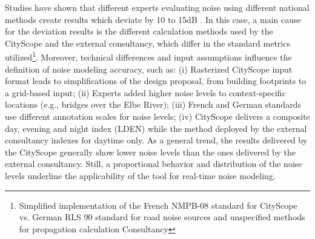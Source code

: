 {{{            \newline
            Studies have shown that different experts evaluating noise using different national methods create results which deviate by 10 to 15dB \cite{nw05}. In this case, a main cause for the deviation results is the different calculation methods used by the CityScope and the external consultancy, which differ in the standard metrics utilized\footnote{Simplified implementation of the French NMPB-08 standard for CityScope vs. German RLS 90 standard for road noise sources and unspecified methods for propagation calculation Consultancy}. Moreover, technical differences and input assumptions influence the definition of noise modeling accuracy, such as:
            (i) Rasterized CityScope input format leads to simplifications of the design proposal, from building footprints to a grid-based input;
            (ii) Experts added higher noise levels to context-specific locations (e.g., bridges over the Elbe River);
            (iii) French and German standards use different annotation scales for noise levels;
            (iv) CityScope delivers a composite day, evening and night index (LDEN) while the method deployed by the external consultancy indexes for daytime only.
            \newline
            As a general trend, the results delivered by the CityScope generally show lower noise levels than the ones delivered by the external consultancy. Still, a proportional behavior and distribution of the noise levels underline the applicability of the tool for real-time noise modeling.
        }


}}
